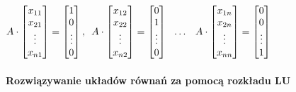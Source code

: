 \documentclass[11pt]{article}
\begin{document}
\begin{center}
\begin{math}
A \cdot
\begin{bmatrix}
    x_{11} \\
    x_{21} \\
    \vdots \\
    x_{n1} 
\end{bmatrix}
=
\begin{bmatrix}
    1 \\
    0 \\
    \vdots \\
    0
\end{bmatrix}
,
\hspace{0.5em}
A \cdot
\begin{bmatrix}
    x_{12} \\
    x_{22} \\
    \vdots \\
    x_{n2} 
\end{bmatrix}
=
\begin{bmatrix}
    0 \\
    1 \\
    \vdots \\
    0
\end{bmatrix}
\hspace{0.7em} \hdots \hspace{0.8em}
A \cdot
\begin{bmatrix}
    x_{1n} \\
    x_{2n} \\
    \vdots \\
    x_{nn} 
\end{bmatrix}
=
\begin{bmatrix}
    0 \\
    0 \\
    \vdots \\
    1
\end{bmatrix}
\end{math}
\end{center}

\paragraph{Rozwiązywanie układów równań za pomocą rozkładu LU}
\end{document}
